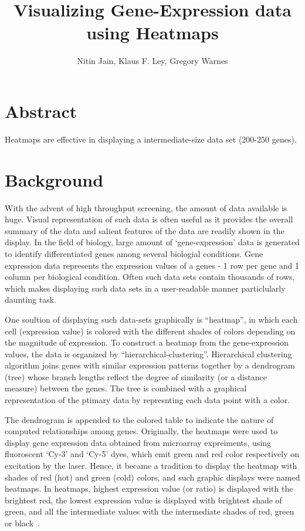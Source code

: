 \documentclass[12pt, oneside, letterpaper]{article}
\begin{document}
\title{Visualizing Gene-Expression data using Heatmaps}
\author{Nitin Jain,  Klaus F. Ley, Gregory Warnes}

\maketitle

\section*{Abstract}
Heatmaps are
effective in displaying a intermediate-size data set (200-250
genes). 

\section*{Background}

With the advent of high throughput screening, the amount of data
available is huge. Visual representation of such data is often
useful as it provides the overall summary of the data and salient
features of the data are readily shown in the display. In the field
of biology, large amount of `gene-expression' data is generated to
identify differentiated genes among several biologial
conditions. Gene expression data represents the expression values of
a genes - 1 row per gene and 1 column per biological
condition. Often such data sets contain thousands of rows, which
makes displaying such data sets in a user-readable manner
particlularly daunting task.

One soultion of displaying such data-sets graphically is
``heatmap'', in which each cell (expression value) is colored with
the different shades of colors depending on the magnitude of
expression. To construct a heatmap from the gene-expression values,
the data is organized by ``hierarchical-clustering''. Hierarchical
clustering algorithm joins genes with similar expression patterns
together by a dendrogram (tree) whose branch lengths reflect the
degree of similarity (or a distance measure) between the genes.  The
tree is combined with a graphical representation of the ptimary data
by represnting each data point with a color.


The dendrogram is appended to the colored table to indicate the
nature of computed relationships among genes. Originally, the
heatmaps were used to display gene expression data obtained from
microarray expreiments, using fluoroscent `Cy-3' and `Cy-5' dyes,
which emit green and red color respectively on excitation by the
laser. Hence, it became a tradition to display the heatmap with
shades of red (hot) and green (cold) colors, and such graphic
displays were named heatmaps. In heatmaps, highest expression value
(or ratio) is displayed with the brightest red, the lowest
expression value is displayed with brightest shade of green, and all
the intermediate values with the intermediate shades of red, green
or black~\cite{Eisen1998}.
\end{document}
